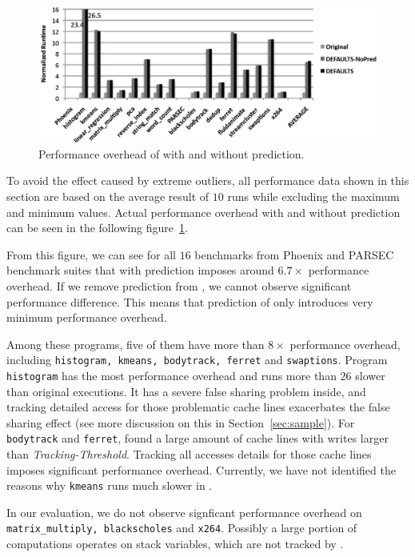 \begin{figure}[!ht]
\begin{center}
\includegraphics[width=6.5in]{fig/perf}
\end{center}
\caption{
Performance overhead of \Predator{} with and without prediction.
\label{fig:perf}}
\end{figure}

To avoid the effect caused by extreme outliers, all performance data shown in this section
are based on the average result of $10$ runs while excluding the maximum and minimum values.
Actual performance overhead with and without prediction 
can be seen in the following figure~\ref{fig:perf}. 

From this figure, we can see for all $16$ benchmarks from Phoenix and PARSEC
benchmark suites that \Predator{} with prediction imposes around $6.7\times$
performance overhead. 
If we remove prediction from \Predator{}, we cannot observe significant performance difference.
This means that prediction of \Predator{} only introduces very minimum performance overhead. 

Among these programs, five of them have more than $8\times$ performance overhead, 
including \texttt{histogram, kmeans, bodytrack, ferret} and \texttt{swaptions}. 
Program \texttt{histogram} has the most performance overhead and 
runs more than $26$ slower than original executions. 
It has a severe false sharing problem inside, and tracking detailed access for those
problematic cache lines exacerbates the 
false sharing effect (see more discussion on this in Section~\ref{sec:sample}). 
For \texttt{bodytrack} and \texttt{ferret}, \Predator{} found a large amount of cache lines with 
writes larger than {\it Tracking-Threshold}. 
Tracking all accesses details for those cache lines 
imposes significant performance overhead. 
Currently, we have not identified the reasons 
why \texttt{kmeans} runs much slower in \Predator{}.   

In our evaluation, we do not observe signficant performance overhead on 
\texttt{matrix\_multiply, blackscholes} and 
\texttt{x264}.
Possibly a large portion of computations operates on stack variables, which are
not tracked by \Predator{}. 

